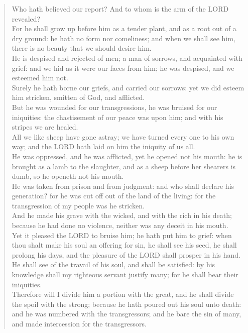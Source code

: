 \documentclass[MAIN]{subfiles}
\begin{document}
\begin{verse}
Who hath believed our report? And to whom is the arm of the {\hge LORD} revealed?\\
For he shall grow up before him as a tender plant, and as a root out of a dry ground: he hath no form nor comeliness; and when we shall see him, there is no beauty that we should desire him.\\
He is despised and rejected of men; a man of sorrows, and acquainted with grief: and we hid as it were our faces from him; he was despised, and we esteemed him not.\\
Surely he hath borne our griefs, and carried our sorrows: yet we did esteem him stricken, smitten of God, and afflicted.\\
But he was wounded for our transgressions, he was bruised for our iniquities: the chastisement of our peace was upon him; and with his stripes we are healed.\\
All we like sheep have gone astray; we have turned every one to his own way; and the {\hge LORD} hath laid on him the iniquity of us all.\\
He was oppressed, and he was afflicted, yet he opened not his mouth: he is brought as a lamb to the slaughter, and as a sheep before her shearers is dumb, so he openeth not his mouth.\\
He was taken from prison and from judgment: and who shall declare his generation? for he was cut off out of the land of the living: for the transgression of my people was he stricken.\\
And he made his grave with the wicked, and with the rich in his death; because he had done no violence, neither was any deceit in his mouth.\\
Yet it pleased the {\hge LORD} to bruise him; he hath put him to grief: when thou shalt make his soul an offering for sin, he shall see his seed, he shall prolong his days, and the pleasure of the {\hge LORD} shall prosper in his hand.\\
He shall see of the travail of his soul, and shall be satisfied: by his knowledge shall my righteous servant justify many; for he shall bear their iniquities.\\
Therefore will I divide him a portion with the great, and he shall divide the spoil with the strong; because he hath poured out his soul unto death: and he was numbered with the transgressors; and he bare the sin of many, and made intercession for the transgressors.
\end{verse}
\end{document}
